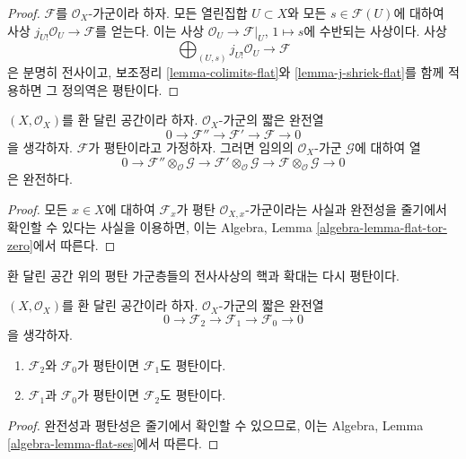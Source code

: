 \begin{proof}
$\mathcal{F}$를 $\mathcal{O}_X$-가군이라 하자. 모든 열린집합
$U \subset X$와 모든 $s \in \mathcal{F}(U)$에 대하여 사상
$j_{U!}\mathcal{O}_U \to \mathcal{F}$를 얻는다. 이는 사상
$\mathcal{O}_U \to \mathcal{F}|_U$, $1 \mapsto s$에 수반되는 사상이다.
사상
$$
\bigoplus\nolimits_{(U, s)} j_{U!}\mathcal{O}_U
\longrightarrow
\mathcal{F}
$$
은 분명히 전사이고, 보조정리 \ref{lemma-colimits-flat}와
\ref{lemma-j-shriek-flat}를 함께 적용하면 그 정의역은 평탄이다.
\end{proof}

\begin{lemma}
\label{lemma-flat-tor-zero}
$(X, \mathcal{O}_X)$를 환 달린 공간이라 하자.
$\mathcal{O}_X$-가군의 짧은 완전열
$$
0 \to \mathcal{F}'' \to \mathcal{F}' \to \mathcal{F} \to 0
$$
을 생각하자. $\mathcal{F}$가 평탄이라고 가정하자. 그러면 임의의
$\mathcal{O}_X$-가군 $\mathcal{G}$에 대하여 열
$$
0 \to
\mathcal{F}'' \otimes_\mathcal{O} \mathcal{G} \to
\mathcal{F}' \otimes_\mathcal{O} \mathcal{G} \to
\mathcal{F} \otimes_\mathcal{O} \mathcal{G} \to 0
$$
은 완전하다.
\end{lemma}

\begin{proof}
모든 $x \in X$에 대하여 $\mathcal{F}_x$가 평탄
$\mathcal{O}_{X, x}$-가군이라는 사실과 완전성을 줄기에서 확인할 수
있다는 사실을 이용하면, 이는 Algebra, Lemma
\ref{algebra-lemma-flat-tor-zero}에서 따른다.
\end{proof}

\begin{lemma}
\label{lemma-flat-ses}
\begin{slogan}
환 달린 공간 위의 평탄 가군층들의 전사사상의 핵과 확대는 다시 평탄이다.
\end{slogan}
$(X, \mathcal{O}_X)$를 환 달린 공간이라 하자.
$\mathcal{O}_X$-가군의 짧은 완전열
$$
0 \to
\mathcal{F}_2 \to
\mathcal{F}_1 \to
\mathcal{F}_0 \to 0
$$
을 생각하자.
\begin{enumerate}
\item $\mathcal{F}_2$와 $\mathcal{F}_0$가 평탄이면 $\mathcal{F}_1$도 평탄이다.
\item $\mathcal{F}_1$과 $\mathcal{F}_0$가 평탄이면 $\mathcal{F}_2$도 평탄이다.
\end{enumerate}
\end{lemma}

\begin{proof}
완전성과 평탄성은 줄기에서 확인할 수 있으므로, 이는 Algebra, Lemma
\ref{algebra-lemma-flat-ses}에서 따른다.
\end{proof}

